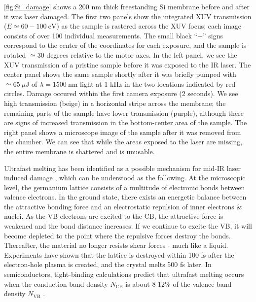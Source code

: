 \cref{fig:Si_damage} shows a 200 nm thick freestanding Si membrane before and after it was laser damaged. The first two panels show the integrated XUV transmission ($E \simeq 60-100 \ \textrm{eV}$) as the sample is rastered across the XUV focus; each image consists of over 100 individual measurements. The small black ``+'' signs correspond to the center of the coordinates for each exposure, and the sample is rotated $\simeq 30$ degrees relative to the motor axes. In the left panel, we see the XUV transmission  of a pristine sample before it was exposed to the IR laser. The center panel shows the same sample shortly after it was briefly pumped with $\simeq 65 \ \mu \textrm{J}$ of $\lambda=1500 \ \textrm{nm}$ light at 1 kHz in the two locations indicated by red circles. Damage occured within the first camera exposure (2 seconds). We see high transmission (beige) in a horizontal stripe across the membrane; the remaining parts of the sample have lower transmission (purple), although there are signs of increased transmission in the bottom-center area of the sample. The right panel shows a microscope image of the sample after it was removed from the chamber. We can see that while the areas exposed to the laser are missing, the entire membrane is shattered and is unusable.

Ultrafast melting has been identified as a possible mechanism for mid-IR laser induced damage \cite{austinSemiconductorSurfaceModification2017,austinFemtosecondLaserDamage2018}, which can be understood as the following. At the microscopic level, the germanium lattice consists of a multitude of electronic bonds between valence electrons. In the ground state, there exists an energetic balance between the attractive bonding force and an electrostatic repulsion of inner electrons \& nuclei. As the VB electrons are excited to the CB, the attractive force is weakened and the bond distance increases. If we continue to excite the VB, it will become depleted to the point where the repulsive forces destroy the bonds. Thereafter, the material no longer resists shear forces - much like a liquid. Experiments have shown that the lattice is destroyed within 100 fs after the electron-hole plasma is created, and the crystal melts 500 fs later. In semiconductors, tight-binding calculations predict that ultrafast melting occurs when the conduction band density $N_{\textrm{CB}}$ is about 8-12\% of the valence band density $N_{\textrm{VB}}$ \cite{stampfliTheoryLaserinducedInstability1990,austinFemtosecondLaserDamage2018}.

